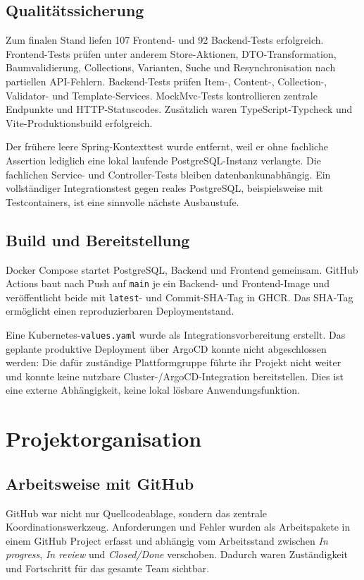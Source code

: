 ﻿\documentclass[11pt,a4paper]{article}
\begin{document}
\subsection{Qualitätssicherung}
Zum finalen Stand liefen 107 Frontend- und 92 Backend-Tests erfolgreich.
Frontend-Tests prüfen unter anderem Store-Aktionen, DTO-Transformation,
Baumvalidierung, Collections, Varianten, Suche und Resynchronisation nach
partiellen API-Fehlern. Backend-Tests prüfen Item-, Content-, Collection-,
Validator- und Template-Services. MockMvc-Tests kontrollieren zentrale
Endpunkte und HTTP-Statuscodes. Zusätzlich waren TypeScript-Typcheck und
Vite-Produktionsbuild erfolgreich.

Der frühere leere Spring-Kontexttest wurde entfernt, weil er ohne fachliche
Assertion lediglich eine lokal laufende PostgreSQL-Instanz verlangte. Die
fachlichen Service- und Controller-Tests bleiben datenbankunabhängig. Ein
vollständiger Integrationstest gegen reales PostgreSQL, beispielsweise mit
Testcontainers, ist eine sinnvolle nächste Ausbaustufe.

\subsection{Build und Bereitstellung}
Docker Compose startet PostgreSQL, Backend und Frontend gemeinsam. GitHub
Actions baut nach Push auf \texttt{main} je ein Backend- und Frontend-Image
und veröffentlicht beide mit \texttt{latest}- und Commit-SHA-Tag in GHCR. Das
SHA-Tag ermöglicht einen reproduzierbaren Deploymentstand.

Eine Kubernetes-\texttt{values.yaml} wurde als Integrationsvorbereitung
erstellt. Das geplante produktive Deployment über ArgoCD konnte nicht
abgeschlossen werden: Die dafür zuständige Plattformgruppe führte ihr Projekt
nicht weiter und konnte keine nutzbare Cluster-/ArgoCD-Integration
bereitstellen. Dies ist eine externe Abhängigkeit, keine lokal lösbare
Anwendungsfunktion.

\section{Projektorganisation}
\subsection{Arbeitsweise mit GitHub}
GitHub war nicht nur Quellcodeablage, sondern das zentrale
Koordinationswerkzeug. Anforderungen und Fehler wurden als Arbeitspakete in
einem GitHub Project erfasst und abhängig vom Arbeitsstand zwischen
\emph{In progress}, \emph{In review} und \emph{Closed/Done} verschoben.
Dadurch waren Zuständigkeit und Fortschritt für das gesamte Team sichtbar.
\end{document}
